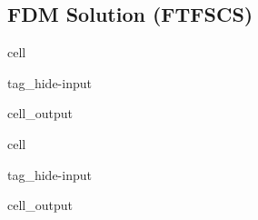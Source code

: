 \documentclass[letterpaper,10pt,english,openany,oneside]{jupyterBook}
\begin{document}
\subsection{FDM Solution (FTFSCS)}
\label{\detokenize{LBM-Study/Convective-Diffusive-Equation:fdm-solution-ftfscs}}
\begin{sphinxuseclass}{cell}
\begin{sphinxuseclass}{tag_hide-input}\begin{sphinxVerbatimOutput}

\begin{sphinxuseclass}{cell_output}
\noindent{}

\end{sphinxuseclass}\end{sphinxVerbatimOutput}

\end{sphinxuseclass}
\end{sphinxuseclass}
\begin{sphinxuseclass}{cell}
\begin{sphinxuseclass}{tag_hide-input}\begin{sphinxVerbatimOutput}

\begin{sphinxuseclass}{cell_output}
\noindent{}

\end{sphinxuseclass}\end{sphinxVerbatimOutput}

\end{sphinxuseclass}
\end{sphinxuseclass}
\end{document}
